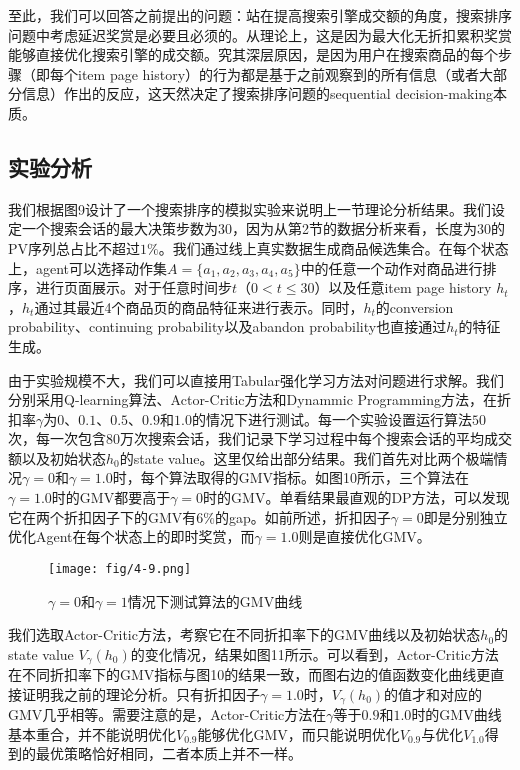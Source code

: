 至此，我们可以回答之前提出的问题：站在提高搜索引擎成交额的角度，搜索排序问题中考虑延迟奖赏是必要且必须的。从理论上，这是因为最大化无折扣累积奖赏能够直接优化搜索引擎的成交额。究其深层原因，是因为用户在搜索商品的每个步骤（即每个item page history）的行为都是基于之前观察到的所有信息（或者大部分信息）作出的反应，这天然决定了搜索排序问题的sequential decision-making本质。

\subsection{实验分析}
我们根据图9设计了一个搜索排序的模拟实验来说明上一节理论分析结果。我们设定一个搜索会话的最大决策步数为30，因为从第2节的数据分析来看，长度为$30$的PV序列总占比不超过$1\%$。我们通过线上真实数据生成商品候选集合。在每个状态上，agent可以选择动作集$A = \{a_1, a_2, a_3, a_4, a_5\}$中的任意一个动作对商品进行排序，进行页面展示。对于任意时间步$t$（$0 < t \leq 30$）以及任意item page history $h_t$，$h_t$通过其最近4个商品页的商品特征来进行表示。同时，$h_t$的conversion probability、continuing probability以及abandon probability也直接通过$h_t$的特征生成。

由于实验规模不大，我们可以直接用Tabular强化学习方法对问题进行求解。我们分别采用Q-learning算法、Actor-Critic方法和Dynammic Programming方法，在折扣率$\gamma$为$0$、$0.1$、$0.5$、$0.9$和$1.0$的情况下进行测试。每一个实验设置运行算法$50$次，每一次包含$80$万次搜索会话，我们记录下学习过程中每个搜索会话的平均成交额以及初始状态$h_0$的state value。这里仅给出部分结果。我们首先对比两个极端情况$\gamma=0$和$\gamma=1.0$时，每个算法取得的GMV指标。如图10所示，三个算法在$\gamma=1.0$时的GMV都要高于$\gamma=0$时的GMV。单看结果最直观的DP方法，可以发现它在两个折扣因子下的GMV有$6\%$的gap。如前所述，折扣因子$\gamma=0$即是分别独立优化Agent在每个状态上的即时奖赏，而$\gamma=1.0$则是直接优化GMV。

\begin{figure}[!h]
\centering
\texttt{[image: fig/4-9.png]}
\caption{ $\gamma=0$和$\gamma=1$情况下测试算法的GMV曲线}
\end{figure}

我们选取Actor-Critic方法，考察它在不同折扣率下的GMV曲线以及初始状态$h_0$的state value $V_{\gamma}(h_0)$的变化情况，结果如图11所示。可以看到，Actor-Critic方法在不同折扣率下的GMV指标与图10的结果一致，而图右边的值函数变化曲线更直接证明我之前的理论分析。只有折扣因子$\gamma=1.0$时，$V_{\gamma}(h_0)$的值才和对应的GMV几乎相等。需要注意的是，Actor-Critic方法在$\gamma$等于$0.9$和$1.0$时的GMV曲线基本重合，并不能说明优化$V_{0.9}$能够优化GMV，而只能说明优化$V_{0.9}$与优化$V_{1.0}$得到的最优策略恰好相同，二者本质上并不一样。

